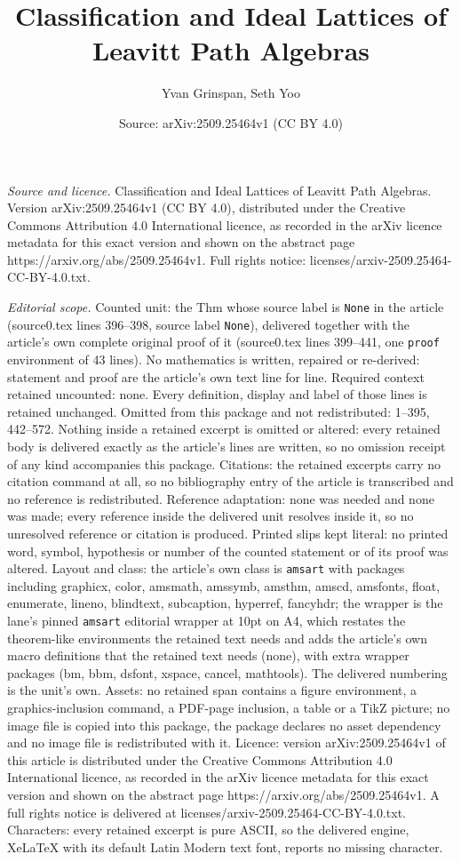 \documentclass[10pt,a4paper]{amsart}
\title[Classification and Ideal Lattices of Leavitt Path Algebras]{Classification and Ideal Lattices of Leavitt Path Algebras}
\author{Yvan Grinspan, Seth Yoo}
\date{Source: arXiv:2509.25464v1 (CC BY 4.0)}
\begin{document}
\maketitle

\noindent\emph{Source and licence.} Classification and Ideal Lattices of Leavitt Path Algebras. Version arXiv:2509.25464v1 (CC BY 4.0), distributed under the Creative Commons Attribution 4.0 International licence, as recorded in the arXiv licence metadata for this exact version and shown on the abstract page https://arxiv.org/abs/2509.25464v1. Full rights notice: licenses/arxiv-2509.25464-CC-BY-4.0.txt.\par\smallskip

\noindent\textit{Editorial scope.} Counted unit: the Thm whose source label is \texttt{None} in the article (source0.tex lines 396--398, source label \texttt{None}), delivered together with the article's own complete original proof of it (source0.tex lines 399--441, one \texttt{proof} environment of 43 lines). No mathematics is written, repaired or re-derived: statement and proof are the article's own text line for line. Required context retained uncounted: none. Every definition, display and label of those lines is retained unchanged. Omitted from this package and not redistributed: 1--395, 442--572. Nothing inside a retained excerpt is omitted or altered: every retained body is delivered exactly as the article's lines are written, so no omission receipt of any kind accompanies this package. Citations: the retained excerpts carry no citation command at all, so no bibliography entry of the article is transcribed and no reference is redistributed. Reference adaptation: none was needed and none was made; every reference inside the delivered unit resolves inside it, so no unresolved reference or citation is produced. Printed slips kept literal: no printed word, symbol, hypothesis or number of the counted statement or of its proof was altered. Layout and class: the article's own class is \texttt{amsart} with packages including graphicx, color, amsmath, amssymb, amsthm, amscd, amsfonts, float, enumerate, lineno, blindtext, subcaption, hyperref, fancyhdr; the wrapper is the lane's pinned \texttt{amsart} editorial wrapper at 10pt on A4, which restates the theorem-like environments the retained text needs and adds the article's own macro definitions that the retained text needs (none), with extra wrapper packages (bm, bbm, dsfont, xspace, cancel, mathtools). The delivered numbering is the unit's own. Assets: no retained span contains a figure environment, a graphics-inclusion command, a PDF-page inclusion, a table or a TikZ picture; no image file is copied into this package, the package declares no asset dependency and no image file is redistributed with it. Licence: version arXiv:2509.25464v1 of this article is distributed under the Creative Commons Attribution 4.0 International licence, as recorded in the arXiv licence metadata for this exact version and shown on the abstract page https://arxiv.org/abs/2509.25464v1. A full rights notice is delivered at licenses/arxiv-2509.25464-CC-BY-4.0.txt. Characters: every retained excerpt is pure ASCII, so the delivered engine, XeLaTeX with its default Latin Modern text font, reports no missing character.
\end{document}
